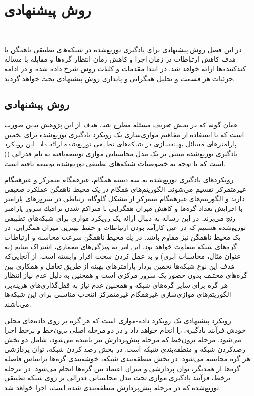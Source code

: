 \chapter{روش پیشنهادی}

\newpage
‎\renewcommand{\baselinestretch}{2}\normalsize‎
\label{ProposedApproach}

در این فصل روش پیشنهادی برای یادگیری توزیع‌شده در شبکه‌های تطبیقی ناهمگن با هدف کاهش ارتباطات در زمان اجرا و کاهش زمان انتظار گره‌ها و مقابله با مساله کندکننده‌ها ارائه خواهد شد. در ابتدا مقدمات و کلیات روش شرح داده شده و در ادامه جزئیات هر قسمت و تحلیل همگرایی و پایداری روش پیشنهادی بحث خواهد گردید.
\section{روش پیشنهادی}
همان گونه که در بخش تعریف مسئله مطرح شد، هدف از این پژوهش بدین صورت است که با استفاده از مفاهیم موازی‌سازی یک رویکرد یادگیری توزیع‌شده برای تخمین پارامترهای مسائل بهینه‌سازی در شبکه‌های تطبیقی توزیع‌شده ارائه داد. این رویکرد یادگیری توزیع‌شده مبتنی بر یک مدل محاسباتی موازی توسعه‌یافته به نام  فدرالی () است که با توجه به خصوصیات شبکه‌های تطبیقی توزیع‌شده توسعه‌ یافته است. 

رویکردهای یادگیری توزیع‌شده به سه دسته همگام، غیرهمگام متمرکز و غیرهمگام غیرمتمركز تقسيم مي‌شوند. الگوریتم‌های همگام در یک محیط ناهمگن عملکرد ضعیفی دارند و الگوریتم‌های غیرهمگام متمرکز از مشکل گلوگاه ارتباطی در سرورهای پارامتر با افزایش تعداد گره‌ها و كاهش ميزان همگرايي با متراكم شدن ترافيك سرور پارامتر  رنج می‌برند. در این رساله به دنبال ارائه یک رویکرد موازی برای شبکه‌های تطبیقی توزیع‌شده هستیم که در عین کارآمد بودن ارتباطات و حفظ بهترین میزان همگرایی، در یک محیط ناهمگن نیز مقاوم باشد. در يك محيط ناهمگن سرعت محاسبه و ارتباطات گره‌های شبکه متفاوت خواهد بود. این امر به ویژگی‌های معماری، اشتراک منابع (به عنوان مثال، محاسبات ابری) و بد عمل كردن سخت افزار وابسته است. از آنجایی‌که هدف این نوع شبکه‌ها تخمین بردار پارامترهای بهینه از طریق تعامل و همکاری بین گره‌های مختلف بدون حضور یک سرور مرکزی است و همچنین به دلیل عدم نیاز انتظار هر گره برای سایر گره‌های شبکه و همچنین عدم نیاز به قفل‌گذاری‌های هزینه‌بر، الگوریتم‌های موازی‌سازی غیرهمگام غیرمتمرکز انتخاب مناسبی برای این شبکه‌ها می‌باشند. 

رویکرد پیشنهادی یک رویکرد داده-موازی است که هر گره بر روی داده‌های محلی خودش فرآیند یادگیری را انجام خواهد داد و در دو مرحله اصلی برون‌خط و برخط اجرا می‌شود. مرحله برون‌خط که مرحله پیش‌پردازش نیز نامیده می‌شود، شامل دو بخش رصدکردن شبکه و منطقه‌بندی شبکه است. در بخش رصد کردن شبکه، توان پردازشی هر گره محاسبه می‌شود. در بخش منطقه‌بندی شبکه، خوشه‌بندی گره‌ها براساس فاصله گره‌ها از همدیگر، توان پردازشی و میزان اعتماد بین گره‌ها انجام می‌شود. در مرحله برخط، فرآیند یادگیری موازی تحت مدل محاسباتی  فدرالی بر روی شبکه تطبیقی توزیع‌شده که در مرحله پیش‌پردازش منطقه‌بندی شده است، اجرا خواهد شد. 

